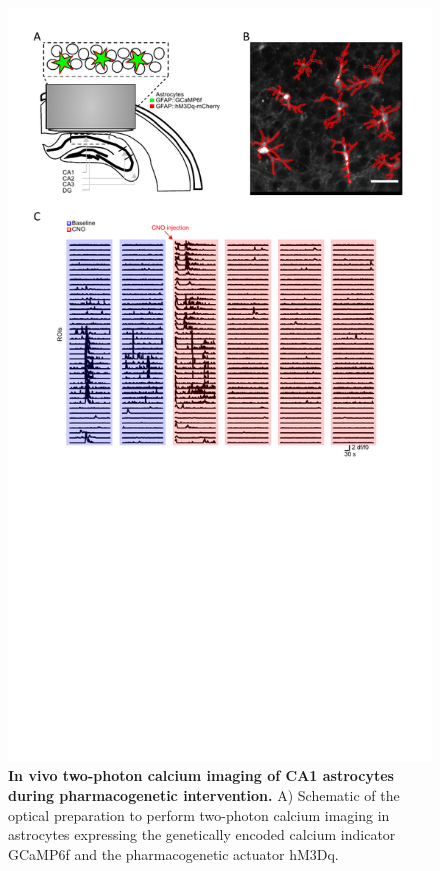 \begin{figure}[h!]
    \centering
    \includegraphics[trim={0 280 0 0},clip,width=\textwidth]{Figures/Chapter4/CNO_effect_calcium.pdf}
    \caption[In vivo two-photon calcium imaging of CA1 astrocytes during pharmacogenetic intervention.]{\textbf{In vivo two-photon calcium imaging of CA1 astrocytes during pharmacogenetic intervention.} 
    A) Schematic of the optical preparation to perform two-photon calcium imaging in astrocytes expressing the genetically encoded calcium indicator GCaMP6f and the pharmacogenetic actuator hM3Dq. 
}
\end{figure}
